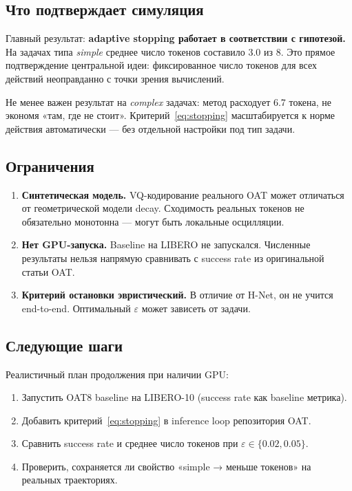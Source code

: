 \documentclass[12pt,a4paper]{article}
\begin{document}
\subsection{Что подтверждает симуляция}

Главный результат: \textbf{adaptive stopping работает в соответствии с гипотезой.}
На задачах типа \textit{simple} среднее число токенов составило 3.0 из 8.
Это прямое подтверждение центральной идеи: фиксированное число токенов для всех
действий неоправданно с точки зрения вычислений.

Не менее важен результат на \textit{complex} задачах: метод расходует 6.7 токена,
не экономя «там, где не стоит». Критерий~\eqref{eq:stopping} масштабируется к норме
действия автоматически --- без отдельной настройки под тип задачи.

\subsection{Ограничения}

\begin{enumerate}[leftmargin=1.4cm]
    \item \textbf{Синтетическая модель.} VQ-кодирование реального OAT может
          отличаться от геометрической модели decay. Сходимость реальных токенов
          не обязательно монотонна --- могут быть локальные осцилляции.
    \item \textbf{Нет GPU-запуска.} Baseline на LIBERO не запускался. Численные
          результаты нельзя напрямую сравнивать с success rate из оригинальной статьи OAT.
    \item \textbf{Критерий остановки эвристический.} В отличие от H-Net, он не
          учится end-to-end. Оптимальный $\varepsilon$ может зависеть от задачи.
\end{enumerate}

\subsection{Следующие шаги}
\label{sec:next_steps}

Реалистичный план продолжения при наличии GPU:
\begin{enumerate}[leftmargin=1.4cm]
    \item Запустить OAT8 baseline на LIBERO-10 (success rate как baseline метрика).
    \item Добавить критерий~\eqref{eq:stopping} в inference loop репозитория OAT.
    \item Сравнить success rate и среднее число токенов при $\varepsilon \in \{0.02, 0.05\}$.
    \item Проверить, сохраняется ли свойство «simple → меньше токенов» на реальных траекториях.
\end{enumerate}
\end{document}
